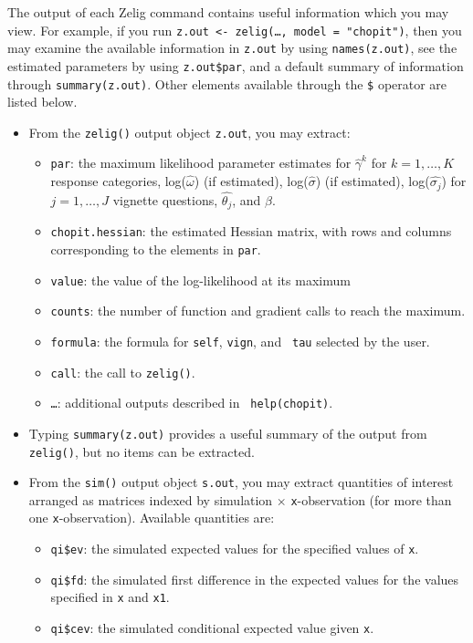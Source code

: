 The output of each Zelig command contains useful information which you
may view.  For example, if you run \texttt{z.out <- zelig(\dots,
  model = "chopit")}, then you may examine the available
information in \texttt{z.out} by using \texttt{names(z.out)},
see the estimated parameters by using {\tt z.out\$par}, and
a default summary of information through \texttt{summary(z.out)}.
Other elements available through the {\tt \$} operator are listed
below.

\begin{itemize}
\item From the {\tt zelig()} output object {\tt z.out}, you may
  extract:
   \begin{itemize}
     \item {\tt par}: the maximum likelihood parameter estimates for
$\widehat{\gamma}^k$ for $k = 1, \dots, K$ response categories,
log($\widehat{\omega}$) (if estimated), log($\widehat{\sigma}$) (if
estimated), log($\widehat{\sigma_j}$) for $j = 1, \dots, J$ vignette
questions, $\widehat{\theta_j}$, and $\widehat{\beta}$.
\item {\tt chopit.hessian}:  the estimated Hessian matrix, with rows
and columns corresponding to the elements in {\tt par}.    
\item {\tt value}: the value of the log-likelihood at its maximum
\item {\tt counts}:  the number of function and gradient calls to
reach the maximum.
\item {\tt formula}: the formula for {\tt self}, {\tt vign}, and {\tt
tau} selected by the user.
\item {\tt call}:  the call to {\tt zelig()}.  
\item {\tt \dots}:  additional outputs described in {\tt
help(chopit)}.  
   \end{itemize}

\item Typing {\tt summary(z.out)} provides a useful summary of the
output from {\tt zelig()}, but no items can be extracted.  

\item From the {\tt sim()} output object {\tt s.out}, you may extract
  quantities of interest arranged as matrices indexed by simulation
  $\times$ {\tt x}-observation (for more than one {\tt x}-observation).
  Available quantities are:

   \begin{itemize}
   \item {\tt qi\$ev}: the simulated expected values for the
     specified values of {\tt x}.
   \item {\tt qi\$fd}: the simulated first difference in the expected
     values for the values specified in {\tt x} and {\tt x1}.
   \item {\tt qi\$cev}: the simulated conditional expected value given
{\tt x}.  
   \end{itemize}
\end{itemize}

